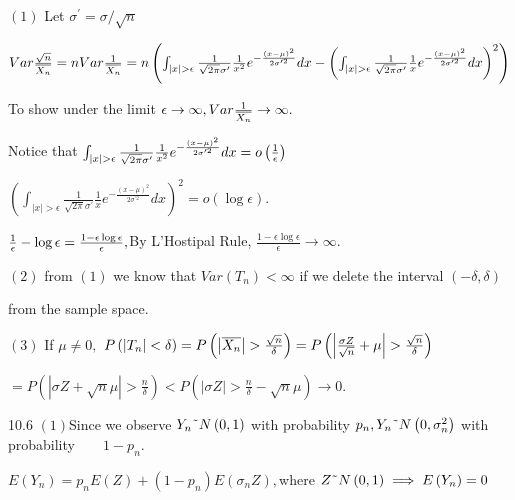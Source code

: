 \documentclass{article}
\begin{document}
$\left( 1\right) $ Let $\sigma ^{\prime }=\sigma /\sqrt{n}$

$Var\frac{\sqrt{n}}{\overline{X_{n}}}=nVar\frac{1}{\overline{X_{n}}}=n\left(
\int_{\left\vert x\right\vert >\epsilon }\frac{1}{\sqrt{2\pi }\sigma
^{\prime }}\frac{1}{x^{2}}e^{-\frac{\left( x-\mu \right) ^{2}}{2\sigma
^{\prime 2}}}dx-\left( \int_{\left\vert x\right\vert >\epsilon }\frac{1}{%
\sqrt{2\pi }\sigma ^{\prime }}\frac{1}{x}e^{-\frac{\left( x-\mu \right) ^{2}%
}{2\sigma ^{\prime 2}}}dx\right) ^{2}\right) $

To show under the limit $\epsilon \rightarrow \infty ,Var\frac{1}{\overline{%
X_{n}}}\rightarrow \infty .$

Notice that $\int_{\left\vert x\right\vert >\epsilon }\frac{1}{\sqrt{2\pi }%
\sigma ^{\prime }}\frac{1}{x^{2}}e^{-\frac{\left( x-\mu \right) ^{2}}{%
2\sigma ^{\prime 2}}}dx=o\left( \frac{1}{\epsilon }\right) $

$\left( \int_{\left\vert x\right\vert >\epsilon }\frac{1}{\sqrt{2\pi }\sigma
^{\prime }}\frac{1}{x}e^{-\frac{\left( x-\mu \right) ^{2}}{2\sigma ^{\prime
2}}}dx\right) ^{2}=o\left( \log \epsilon \right) .$

$\frac{1}{\epsilon }-\log \epsilon =\frac{1-\epsilon \log \epsilon }{%
\epsilon },$By L'Hostipal Rule, $\frac{1-\epsilon \log \epsilon }{\epsilon }%
\rightarrow \infty .$

$\left( 2\right) $ from $\left( 1\right) $ we know that $Var\left(
T_{n}\right) <\infty $ if we delete the interval $\left( -\delta ,\delta
\right) $ 

\bigskip from the sample space. 

$\left( 3\right) $ If $\mu \neq 0,$ $P\left( \left\vert T_{n}\right\vert
<\delta \right) =P\left( \left\vert \overline{X_{n}}\right\vert >\frac{\sqrt{%
n}}{\delta }\right) =P\left( \left\vert \frac{\sigma Z}{\sqrt{n}}+\mu
\right\vert >\frac{\sqrt{n}}{\delta }\right) $

$=P\left( \left\vert \sigma Z+\sqrt{n}\mu \right\vert >\frac{n}{\delta }%
\right) <P\left( \left\vert \sigma Z\right\vert >\frac{n}{\delta }-\sqrt{n}%
\mu \right) \rightarrow 0.$

10.6 $\left( 1\right) $Since we observe $Y_{n}\symbol{126}N\left( 0,1\right) 
$ with probability $p_{n},Y_{n}\symbol{126}N\left( 0,\sigma _{n}^{2}\right) $
with probability$\qquad 1-p_{n}.$

$E\left( Y_{n}\right) =p_{n}E\left( Z\right) +\left( 1-p_{n}\right) E\left(
\sigma _{n}Z\right) ,$where $Z\symbol{126}N\left( 0,1\right) \implies
E\left( Y_{n}\right) =0$
\end{document}
